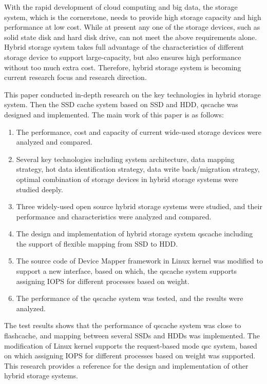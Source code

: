\begin{englishabstract}

With the rapid development of cloud computing and big data, the storage system, which is the cornerstone, needs to provide high storage capacity and high performance at low cost. While at present any one of the storage devices, such as solid state disk and hard disk drive, can not meet the above requirements alone. Hybrid storage system takes full advantage of the characteristics of different storage device to support large-capacity, but also ensures high performance without too much extra cost. Therefore, hybrid storage system is becoming current research focus and research direction. 

This paper conducted in-depth research on the key technologies in hybrid storage system. Then the SSD cache system based on SSD and HDD, qscache was designed and implemented. The main work of this paper is as follows:


\begin{enumerate}[wide]
    \item The performance, cost and capacity of current wide-used storage devices were analyzed and compared.
    \item Several key technologies including system architecture, data mapping strategy, hot data identification strategy, data write back/migration strategy, optimal combination of storage devices in  hybrid storage systems were studied deeply.
    \item Three widely-used open source hybrid storage systems were studied, and their performance and characteristics were analyzed and compared.
    \item The design and implementation of hybrid storage system qscache including the support of flexible mapping from SSD to HDD.
    \item The source code of Device Mapper framework in Linux kernel was modified to support a new interface, based on which, the qscache system supports assigning IOPS for different processes based on weight.
    \item The performance of the qscache system was tested, and the results were analyzed.
\end{enumerate}

The test results shows that the performance of qscache system was close to flashcache, and mapping between several SSDs and HDDs was implemented. The modification of Linux kernel supports the request-based mode qsc  system, based on which assigning IOPS for different processes based on weight was supported. This research provides a reference for the design and implementation of other hybrid storage systems.

\end{englishabstract}

